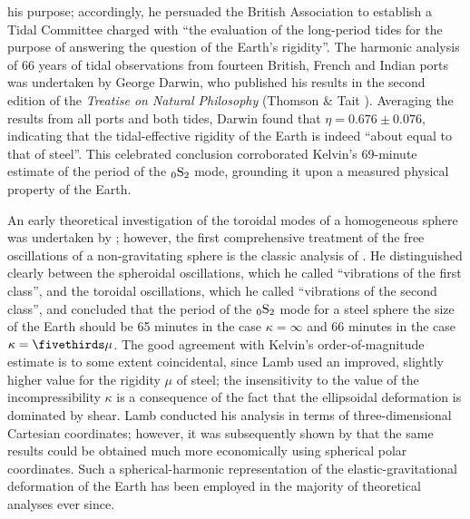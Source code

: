 his purpose; accordingly, he persuaded the British Association
to establish a Tidal Committee charged with ``the evaluation
of the long-period tides for the purpose of answering the question
of the Earth's rigidity''.  The harmonic analysis of 66 years
of tidal observations from fourteen British, French and Indian ports was
undertaken by George Darwin, who published his results in the
second edition of the {\em Treatise on Natural Philosophy\/}
(Thomson \& Tait \citeyear{thomson&tait83}).
Averaging the results from all ports
and both tides, Darwin found that $\eta=0.676 \pm 0.076$, 
indicating that the tidal-effective rigidity of the Earth
is indeed ``about equal to that of steel''.
%
%
This celebrated
conclusion corroborated Kelvin's 69-minute estimate of the period of
the ${}_0{\rm S}_2$ mode, grounding it upon a measured physical
property of the Earth.

An early theoretical investigation of the toroidal modes of
a homogeneous sphere was undertaken by \textcite{jaerisch80};
however, the first comprehensive treatment of the free oscillations
of a non-gravitating sphere is the classic analysis of \textcite{lamb82}.
He distinguished clearly between the spheroidal oscillations, which
he called ``vibrations of the first class'', and the toroidal oscillations,
which he called ``vibrations of the second class'', and concluded that
the period of the ${}_0{\rm S}_2$ mode for a steel sphere the
size of the Earth should be 65 minutes in the case $\kappa=\infty$
and 66 minutes in the case $\kappa=\fivethirds\mu$.  The good agreement
with Kelvin's order-of-magnitude estimate is to some
extent coincidental, since Lamb used
an improved, slightly higher value for the rigidity $\mu$ of steel;
the insensitivity to the value of the incompressibility $\kappa$ is a
consequence of the fact that the ellipsoidal deformation is dominated by shear.
Lamb conducted his analysis in terms of three-dimensional
Cartesian coordinates; however, it was
subsequently shown by \textcite{chree89} that the same results could be
obtained much more economically using spherical polar coordinates.
Such a spherical-harmonic representation of the elastic-gravitational
deformation of the Earth has been employed in the majority of theoretical
analyses ever since.

